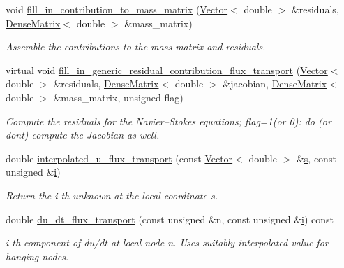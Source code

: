 \begin{DoxyCompactItemize}
\item 
void \hyperlink{classoomph_1_1FluxTransportEquations_a12c2f66dbf817754f548cb51137529fa}{fill\+\_\+in\+\_\+contribution\+\_\+to\+\_\+mass\+\_\+matrix} (\hyperlink{classoomph_1_1Vector}{Vector}$<$ double $>$ \&residuals, \hyperlink{classoomph_1_1DenseMatrix}{Dense\+Matrix}$<$ double $>$ \&mass\+\_\+matrix)
\begin{DoxyCompactList}\small\item\em Assemble the contributions to the mass matrix and residuals. \end{DoxyCompactList}\item 
virtual void \hyperlink{classoomph_1_1FluxTransportEquations_a6994eab818eb7236e24e45b6fedec1f7}{fill\+\_\+in\+\_\+generic\+\_\+residual\+\_\+contribution\+\_\+flux\+\_\+transport} (\hyperlink{classoomph_1_1Vector}{Vector}$<$ double $>$ \&residuals, \hyperlink{classoomph_1_1DenseMatrix}{Dense\+Matrix}$<$ double $>$ \&jacobian, \hyperlink{classoomph_1_1DenseMatrix}{Dense\+Matrix}$<$ double $>$ \&mass\+\_\+matrix, unsigned flag)
\begin{DoxyCompactList}\small\item\em Compute the residuals for the Navier--Stokes equations; flag=1(or 0)\+: do (or don\textquotesingle{}t) compute the Jacobian as well. \end{DoxyCompactList}\item 
double \hyperlink{classoomph_1_1FluxTransportEquations_a919f56a48a7ab618c90ceb41da5afaeb}{interpolated\+\_\+u\+\_\+flux\+\_\+transport} (const \hyperlink{classoomph_1_1Vector}{Vector}$<$ double $>$ \&\hyperlink{cfortran_8h_ab7123126e4885ef647dd9c6e3807a21c}{s}, const unsigned \&\hyperlink{cfortran_8h_adb50e893b86b3e55e751a42eab3cba82}{i})
\begin{DoxyCompactList}\small\item\em Return the i-\/th unknown at the local coordinate s. \end{DoxyCompactList}\item 
double \hyperlink{classoomph_1_1FluxTransportEquations_ab637781b0f2fe83c5bc8f8127af4e1d4}{du\+\_\+dt\+\_\+flux\+\_\+transport} (const unsigned \&n, const unsigned \&\hyperlink{cfortran_8h_adb50e893b86b3e55e751a42eab3cba82}{i}) const
\begin{DoxyCompactList}\small\item\em i-\/th component of du/dt at local node n. Uses suitably interpolated value for hanging nodes. \end{DoxyCompactList}\item 

\end{DoxyCompactItemize}
